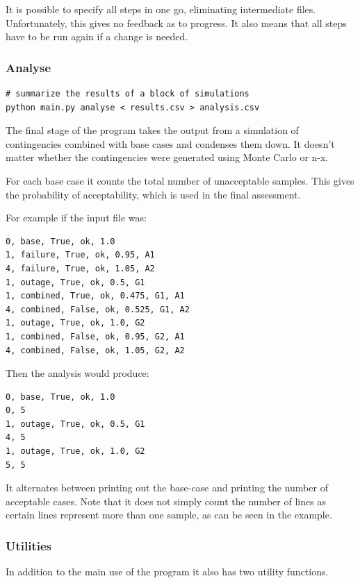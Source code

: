 \documentclass[a4paper,oneside,12pt]{report}
\begin{document}
It is possible to specify all steps in one go, eliminating intermediate
files. Unfortunately, this gives no feedback as to progress. It also means
that all steps have to be run again if a change is needed.

\subsubsection{Analyse}

\begin{verbatim}
# summarize the results of a block of simulations
python main.py analyse < results.csv > analysis.csv
\end{verbatim}

The final stage of the program takes the output from a simulation of
contingencies combined with base cases and condenses them down. It
doesn't matter whether the contingencies were generated using Monte
Carlo or n-x.

For each base case it counts the total number of unacceptable samples. This gives the probability of acceptability, which is used in the final assessment.

For example if the input file was:

\begin{verbatim}
0, base, True, ok, 1.0
1, failure, True, ok, 0.95, A1
4, failure, True, ok, 1.05, A2
1, outage, True, ok, 0.5, G1
1, combined, True, ok, 0.475, G1, A1
4, combined, False, ok, 0.525, G1, A2
1, outage, True, ok, 1.0, G2
1, combined, False, ok, 0.95, G2, A1
4, combined, False, ok, 1.05, G2, A2
\end{verbatim}

Then the analysis would produce:

\begin{verbatim}
0, base, True, ok, 1.0
0, 5
1, outage, True, ok, 0.5, G1
4, 5
1, outage, True, ok, 1.0, G2
5, 5
\end{verbatim}

It alternates between printing out the base-case and printing the number
of acceptable cases. Note that it does not simply count the number of
lines as certain lines represent more than one sample, as can be seen in
the example.

\subsubsection{Utilities}

In addition to the main use of the program it also has two utility
functions.
\end{document}
